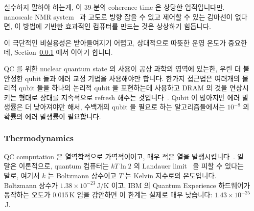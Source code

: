 실수하지 말하야 하는게, 이 39-분의 coherence time 은 상당한 업적입니다만,
nanoscale NMR system~\cite{HJMamin2013QC-nanoscale-NMR} 과 고도로 방향 잡을 수
있고 제어할 수 있는 감마선이 없다면, 이 방법에 기반한 효과적인 컴퓨터를 만드는
것은 상상하기 힘듭니다.

이 극단적인 비실용성은 받아들여지기 어렵고, 상대적으로 따뜻한 운영 온도가
중요한데,
Section~\ref{sec:future:Thermodynamics} 에서 이야기 합니다.

QC 를 위한 nuclear quantum state 의 사용이 공상 과학의 영역에 있는한, 우린 더
불안정한 qubit 들과 에러 교정 기법을 사용해야만 합니다.
한가지 접근법은 여러개의 물리적 qubit 들을 하나의 논리적 qubit 을 표현하는데
사용하고 DRAM 의 것을 연상시키는 형태로 상태를 지속적으로 refresh 해주는
것입니다~\cite{DanielThomasSankPhD}.
Qubit 이 많아지면 에러 발생률은 더 낮아져야만 해서, 수백개의 qubit 을 필요로
하는 알고리즘들에서는 $10^{-8}$ 의 확률의 에러 발생률이 필요합니다.

\subsubsection{Thermodynamics}
\label{sec:future:Thermodynamics}

QC computation 은 열역학적으로 가역적이어고, 매우 적은 열을
발생시킵니다~\cite{Bennett:1973:LRC:1664562.1664568,RichardFeynman1986QuantumMechanicalComputers}.
일 말은 이론적으로, quantum 컴퓨터는 $kT \ln 2$ 의 Landauer
limit~\cite{Landauer:1961:IHG:1661184.1661186} 을 피할 수 있다는 말로, 여기서
$k$ 는 Boltzmann 상수이고 $T$ 는 Kelvin 지수로의 온도입니다.
Boltzmann 상수가 $1.38 \times 10^{-23}$\,J/K 이고, IBM 의 Quantum Experience
하드웨어가 동작하는 오도가 0.015\,K 임을 감안하면 이 한계는 실제로 매우
낮습니다: $1.43 \times 10^{-25}$\,J.

